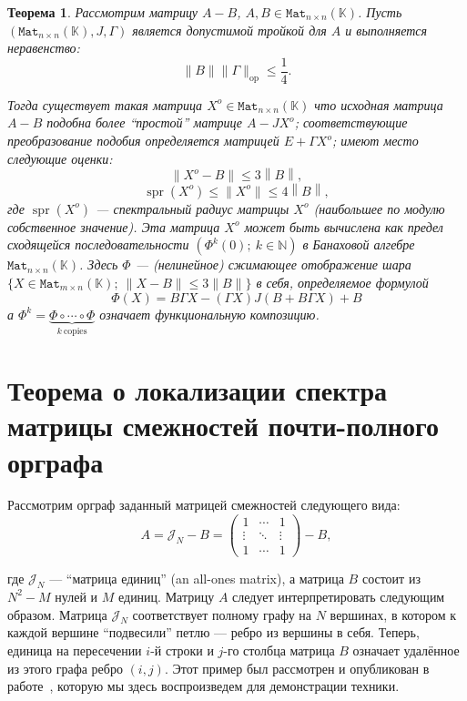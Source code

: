 \documentclass[14pt,a4paper]{extarticle}
\newtheorem{thm}{Теорема}
\theoremstyle{definition}
\begin{document}
\begin{thm}
    Рассмотрим матрицу \( A - B \),
         \( A, B \in \mathtt{Mat}_{n{\times}n}(\mathbb{K}) \).
    Пусть \( (\mathtt{Mat}_{n{\times}n}(\mathbb{K}), J, \Gamma) \)
        является допустимой тройкой для \( A \)
        и выполняется неравенство:
        \[
            \|B\|\|\Gamma\|_{\mathrm{op}} \leq \frac14.
        \]

    Тогда существует такая матрица \( X^o\in\mathtt{Mat}_{n{\times}n}(\mathbb{K}) \)
        что исходная матрица \( A - B \) подобна более ``простой'' матрице \( A
        - J X^o \);
        соответ\-ствующие преобразование подобия определяется матрицей \( E +
        \Gamma X^o \);
        имеют место следующие оценки:
        \[
            \|X^o - B\| \leq 3 \left\|B\right\|,
        \]
        \[
            \operatorname{spr}(X^o) \leq \|X^o\| \leq 4 \left\|B\right\|,
        \]
        где \( \operatorname{spr}(X^o) \)
        --- спектральный радиус матрицы \( X^o \) (наибольшее по модулю
        собственное значение).
    Эта матрица \( X^o \) может быть вычислена как предел сходящейся последовательности
        \( \left( \Phi^k(0);\ k\in\mathbb{N} \right) \)
        в Банаховой алгебре \( \mathtt{Mat}_{n{\times}n}(\mathbb{K}) \).
        Здесь \( \Phi \) --- (нелинейное) сжимающее отображение
        шара \( \{X\in\mathtt{Mat}_{m{\times}n}(\mathbb{K});\ \|X-B\|\leq 3\|B\| \} \)
        в себя, определяемое формулой
    \[
        \Phi(X) = B\Gamma X - (\Gamma X)J(B + B\Gamma X) + B
    \]
        а \( \Phi^k = \underbrace{\Phi\circ\cdots\circ\Phi}_{k\ \text{copies}} \)
        означает функциональную композицию.
\end{thm}

\newpage

\section{Теорема о локализации спектра матрицы смеж\-ностей
  почти-полного ор\-графа}
Рассмотрим орграф заданный матрицей смежностей следующего вида:
\[
    A = \mathcal{J}_N - B = \begin{pmatrix}1 & \cdots & 1 \\ \vdots & \ddots & \vdots \\ 1 & \cdots & 1\end{pmatrix} - B,
\]

где \( \mathcal{J}_N \) --- ``матрица единиц'' (an all-ones matrix),
а матрица \( B \) состоит из \( N^2 - M \) нулей и \( M \) единиц.
Матрицу \( A \) следует интерпретировать следующим образом.
Матрица \( \mathcal{J}_N \) соответствует полному графу на \( N \) вершинах, в
котором к каждой вершине ``подвесили'' петлю --- ребро из вершины в себя.
Теперь, единица на пересечении
\( i \)-й строки и \( j \)-го столбца матрица \( B \)
означает удалённое из этого графа ребро \( (i, j) \).
Этот пример был рассмотрен и опубликован в работе~\cite{sergekozlukov@volgograd},
которую мы здесь воспроизведем для демонстрации техники.
\end{document}
